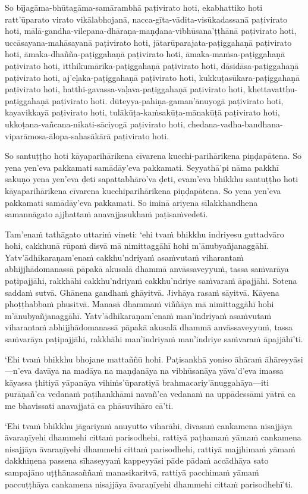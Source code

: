 So bījagāma-bhūtagāma-samārambhā paṭivirato hoti, ekabhattiko hoti ratt'ūparato virato vikālabhojanā, nacca-gīta-vādita-visūkadassanā paṭivirato hoti, mālā­-gandha-vilepana­-dhāraṇa­-maṇḍana­-vibhūsana'ṭṭhānā paṭivirato hoti, uccāsayana-mahāsayanā paṭivirato hoti, jātarūparajata-paṭiggahaṇā paṭivirato hoti, āmaka-dhañña-paṭiggahaṇā paṭivirato hoti, āmaka-maṁsa-paṭiggahaṇā paṭivirato hoti, itthikumārika-paṭiggahaṇā paṭivirato hoti, dāsidāsa-paṭiggahaṇā paṭivirato hoti, aj'eḷaka-paṭiggahaṇā paṭivirato hoti, kukkuṭasūkara-paṭiggahaṇā paṭivirato hoti, hatthi-gavassa-vaḷava-paṭiggahaṇā paṭivirato hoti, khettavatthu-paṭiggahaṇā paṭivirato hoti. dūteyya-pahiṇa-gaman'ānuyogā paṭivirato hoti, kayavikkayā paṭivirato hoti, tulākūṭa-kaṁsakūṭa-mānakūṭā paṭivirato hoti, ukkoṭana-vañcana-nikati-sāciyogā paṭivirato hoti, chedana-­vadha-bandhana­-viparāmosa-ālopa-sahasākārā paṭivirato hoti.

So santuṭṭho hoti kāyaparihārikena cīvarena kucchi-parihārikena piṇḍapātena. So yena yen'eva pakkamati samādāy'eva pakkamati. Seyyathā'pi nāma pakkhī sakuṇo yena yen'eva ḍeti sapattabhāro'va ḍeti, evam'eva bhikkhu santuṭṭho hoti kāyaparihārikena cīvarena kucchiparihārikena piṇḍapātena. So yena yen'eva pakkamati samādāy'eva pakkamati. So iminā ariyena sīlakkhandhena samannāgato ajjhattaṁ anavajjasukhaṁ paṭisaṁvedeti.

\suttaRef{[MN 51]}

Tam'enaṁ tathāgato uttariṁ vineti: `ehi tvaṁ bhikkhu indriyesu guttadvāro hohi, cakkhunā rūpaṁ disvā mā nimittaggāhī hohi m'ānubyañjanaggāhī. Yatv'ādhikaraṇam'enaṁ cakkhu'ndriyaṁ asaṁvutaṁ viharantaṁ abhijjhādomanassā pāpakā akusalā dhammā anvāssaveyyuṁ, tassa saṁvarāya paṭipajjāhi, rakkhāhi cakkhu'ndriyaṁ cakkhu'ndriye saṁvaraṁ āpajjāhi. Sotena saddaṁ sutvā. Ghānena gandhaṁ ghāyitvā. Jivhāya rasaṁ sāyitvā. Kāyena phoṭṭhabbaṁ phusitvā. Manasā dhammaṁ viññāya mā nimittaggāhī hohi m'ānubyañjanaggāhī. Yatv'ādhikaraṇam'enaṁ man'indriyaṁ asaṁvutaṁ viharantaṁ abhijjhādomanassā pāpakā akusalā dhammā anvāssaveyyuṁ, tassa saṁvarāya paṭipajjāhi, rakkhāhi man'indriyaṁ man'indriye saṁvaraṁ āpajjāhī'ti.

`Ehi tvaṁ bhikkhu bhojane mattaññū hohi. Paṭisankhā yoniso āhāraṁ āhāreyyāsi—n'eva davāya na madāya na maṇḍanāya na vibhūsanāya yāva'd'eva imassa kāyassa ṭhitiyā yāpanāya vihiṁs'ūparatiyā brahmacariy'ānuggahāya—iti purāṇañ'ca vedanaṁ paṭihankhāmi navañ'ca vedanaṁ na uppādessāmi yātrā ca me bhavissati anavajjatā ca phāsuvihāro cā'ti.

`Ehi tvaṁ bhikkhu jāgariyaṁ anuyutto viharāhi, divasaṁ cankamena nisajjāya āvaraṇīyehi dhammehi cittaṁ parisodhehi, rattiyā paṭhamaṁ yāmaṁ cankamena nisajjāya āvaraṇīyehi dhammehi cittaṁ parisodhehi, rattiyā majjhimaṁ yāmaṁ dakkhiṇena passena sīhaseyyaṁ kappeyyāsi pāde pādaṁ accādhāya sato sampajāno uṭṭhānasaññaṁ manasikaritvā, rattiyā pacchimaṁ yāmaṁ paccuṭṭhāya cankamena nisajjāya āvaraṇīyehi dhammehi cittaṁ parisodhehī'ti.

